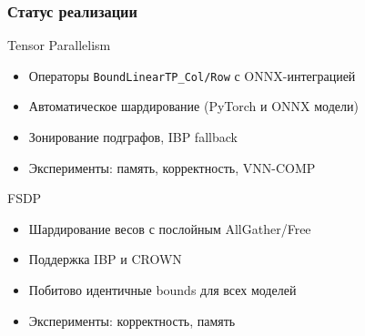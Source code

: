 \begin{frame}
\frametitle{Статус реализации}

\begin{block}{Tensor Parallelism}
\begin{itemize}
    \item[\checkmark] Операторы \texttt{BoundLinearTP\_Col/Row} с ONNX-интеграцией
    \item[\checkmark] Автоматическое шардирование (PyTorch и ONNX модели)
    \item[\checkmark] Зонирование подграфов, IBP fallback
    \item[\checkmark] Эксперименты: память, корректность, VNN-COMP
\end{itemize}
\end{block}

\vspace{0.2cm}

\begin{block}{FSDP}
\begin{itemize}
    \item[\checkmark] Шардирование весов с послойным AllGather/Free
    \item[\checkmark] Поддержка IBP и CROWN
    \item[\checkmark] Побитово идентичные bounds для всех моделей
    \item[\checkmark] Эксперименты: корректность, память
\end{itemize}
\end{block}

\end{frame}
